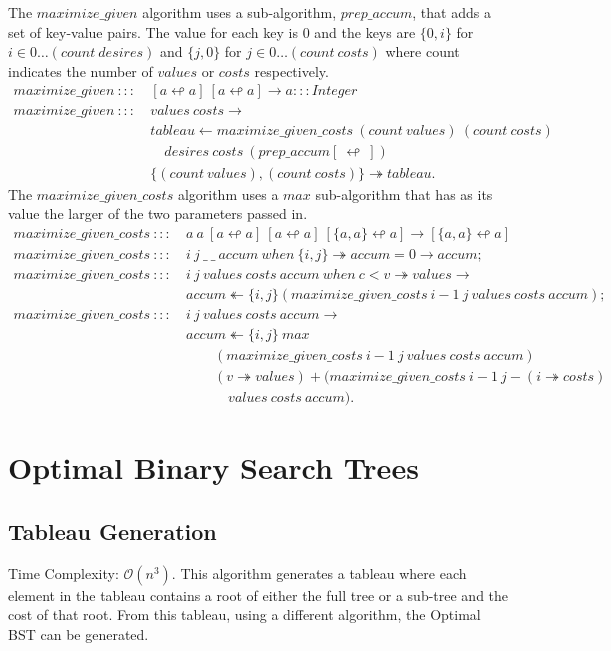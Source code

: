 \documentclass[a4paper,10pt]{book}
\newcommand\when{\  when\ }
\begin{document}
The $maximize\_given$ algorithm uses a sub-algorithm, $prep\_accum$, that adds a set of key-value pairs. The value for each key is $0$ and the keys are $\{0,i\}$ for $i\in 0\ldots (count\ desires)$ and $\{j,0\}$ for $j\in 0\ldots (count\ costs)$ where count indicates the number of $values$ or $costs$ respectively.
\begin{align*}
maximize\_given\ :::\ &[a\looparrowleft a]\ [a\looparrowleft a]\rightarrow a:::Integer\\
maximize\_given\ :::\ &values\ costs\rightarrow\\
	&tableau\leftarrow maximize\_given\_costs\ (count\ values)\ (count\ costs)\\ 
	&\quad desires\ costs\ (prep\_accum [\ \looparrowleft\ ])\\
	&\{(count\ values),(count\ costs)\}\twoheadrightarrow tableau.
\end{align*}
The $maximize\_given\_costs$ algorithm uses a $max$ sub-algorithm that has as its value the larger of the two parameters passed in.
\begin{align*}
maximize\_given\_costs\ :::\ & a\ a\ [a\looparrowleft a]\ [a\looparrowleft a]\ [\{a,a\}\looparrowleft a]\rightarrow [\{a,a\}\looparrowleft a]\\
maximize\_given\_costs\ :::\ & i\ j\ \_\ \_\ accum\when \{i,j\}\twoheadrightarrow accum = 0\rightarrow accum;\\
maximize\_given\_costs\ :::\ &i\ j\ values\ costs\ accum\when c<v\twoheadrightarrow values\rightarrow\\
	&accum\twoheadleftarrow\{i,j\}(maximize\_given\_costs\ i-1\ j\ values\ costs\ accum);\\
maximize\_given\_costs\ :::\ &i\ j\ values\ costs\ accum\rightarrow\\
	&accum\twoheadleftarrow\{i,j\}\ max\\
	&\qquad(maximize\_given\_costs\ i-1\ j\ values\ costs\ accum)\\
	&\qquad (v\twoheadrightarrow values)+(maximize\_given\_costs\ i-1\ j-(i\twoheadrightarrow costs)\\
	&\quad\qquad values\ costs\ accum).
\end{align*}
\section{Optimal Binary Search Trees}

\subsection{Tableau Generation}
Time Complexity: $\mathcal{O}(n^3)$.
This algorithm generates a tableau where each element in the tableau contains a root of either the full tree or a sub-tree and the cost of that root. From this tableau, using a different algorithm, the Optimal BST can be generated. 
\end{document}
